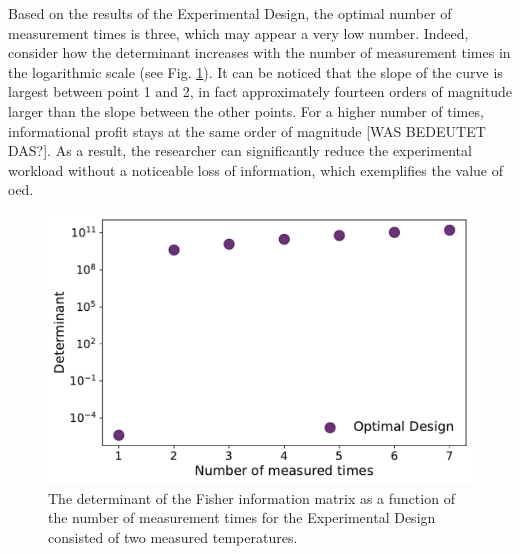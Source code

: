 \documentclass[10pt,A4paper]{article}
\begin{document}
Based on the results of the Experimental Design, the optimal number of measurement times is three, which may appear a very low number.
Indeed, consider how the determinant increases with the number of measurement times in the logarithmic scale (see Fig. \ref{fig:det_vs_ntimes}).
It can be noticed that the slope of the curve is largest between point 1 and 2, in fact approximately fourteen orders of magnitude larger than the slope between the other points.
For a higher number of times, informational profit stays at the same order of magnitude [WAS BEDEUTET DAS?].
As a result, the researcher can significantly reduce the experimental workload without a noticeable loss of information, which exemplifies the value of \ac{oed}.
\begin{figure}[H]
    \centering
    \includegraphics[scale=0.4]{Figures/det_vs_ntimes.pdf}
    \caption{{\footnotesize The determinant of the Fisher information matrix as a function of the number of measurement times for the Experimental Design consisted of two measured temperatures.}}
    \label{fig:det_vs_ntimes}
\end{figure}
\end{document}
